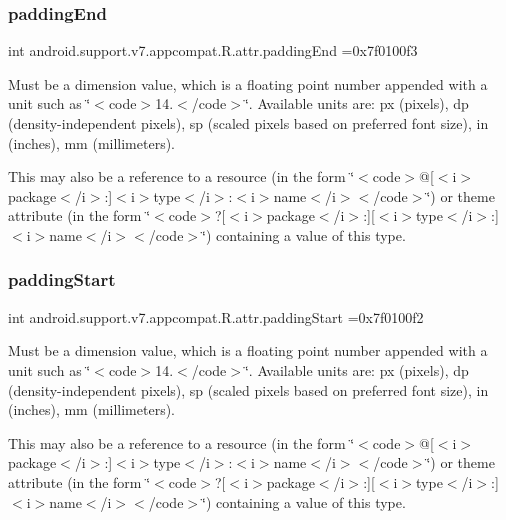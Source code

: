\subsubsection{\texorpdfstring{padding\+End}{paddingEnd}}
{\footnotesize\ttfamily int android.\+support.\+v7.\+appcompat.\+R.\+attr.\+padding\+End =0x7f0100f3\hspace{0.3cm}{\ttfamily [static]}}

Must be a dimension value, which is a floating point number appended with a unit such as \char`\"{}$<$code$>$14.\+5sp$<$/code$>$\char`\"{}. Available units are\+: px (pixels), dp (density-\/independent pixels), sp (scaled pixels based on preferred font size), in (inches), mm (millimeters). 

This may also be a reference to a resource (in the form \char`\"{}$<$code$>$@\mbox{[}$<$i$>$package$<$/i$>$\+:\mbox{]}$<$i$>$type$<$/i$>$\+:$<$i$>$name$<$/i$>$$<$/code$>$\char`\"{}) or theme attribute (in the form \char`\"{}$<$code$>$?\mbox{[}$<$i$>$package$<$/i$>$\+:\mbox{]}\mbox{[}$<$i$>$type$<$/i$>$\+:\mbox{]}$<$i$>$name$<$/i$>$$<$/code$>$\char`\"{}) containing a value of this type. \mbox{\label{classandroid_1_1support_1_1v7_1_1appcompat_1_1R_1_1attr_ad5d87fd81512a9d000e393f93e56bfd4}} 
\subsubsection{\texorpdfstring{padding\+Start}{paddingStart}}
{\footnotesize\ttfamily int android.\+support.\+v7.\+appcompat.\+R.\+attr.\+padding\+Start =0x7f0100f2\hspace{0.3cm}{\ttfamily [static]}}

Must be a dimension value, which is a floating point number appended with a unit such as \char`\"{}$<$code$>$14.\+5sp$<$/code$>$\char`\"{}. Available units are\+: px (pixels), dp (density-\/independent pixels), sp (scaled pixels based on preferred font size), in (inches), mm (millimeters). 

This may also be a reference to a resource (in the form \char`\"{}$<$code$>$@\mbox{[}$<$i$>$package$<$/i$>$\+:\mbox{]}$<$i$>$type$<$/i$>$\+:$<$i$>$name$<$/i$>$$<$/code$>$\char`\"{}) or theme attribute (in the form \char`\"{}$<$code$>$?\mbox{[}$<$i$>$package$<$/i$>$\+:\mbox{]}\mbox{[}$<$i$>$type$<$/i$>$\+:\mbox{]}$<$i$>$name$<$/i$>$$<$/code$>$\char`\"{}) containing a value of this type. \mbox{\label{classandroid_1_1support_1_1v7_1_1appcompat_1_1R_1_1attr_a8d488539e6d98782d46baa1724a9324b}} 
